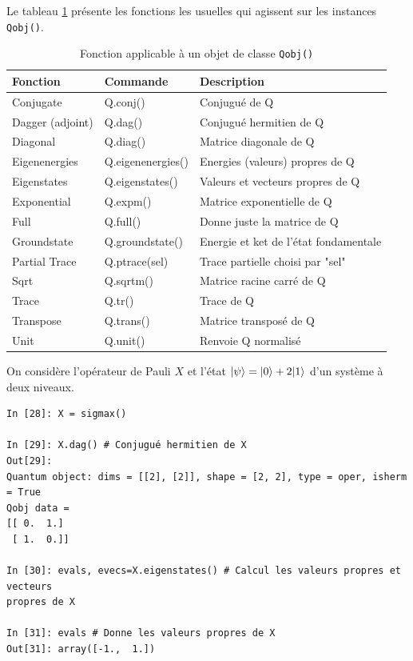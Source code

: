 \begin{itemize}
Le tableau \ref{tab:fonction} présente les fonctions les usuelles qui agissent 
sur les instances \texttt{Qobj()}.
\begin{table}[!h]
\centering
\begin{tabular}{|l|l|l|} \hline \hline
\textbf{Fonction}	& \textbf{Commande}	& \textbf{Description} \\ 
\hline \hline
Conjugate	& Q.conj()	& Conjugué de Q\\ \hline
Dagger (adjoint)	& Q.dag()	& Conjugué hermitien de Q\\ \hline
Diagonal	& Q.diag()	& Matrice diagonale de Q\\ \hline
Eigenenergies	& Q.eigenenergies()	&  Energies (valeurs) propres de Q\\ 
\hline
Eigenstates	& Q.eigenstates()	& Valeurs et vecteurs propres de Q\\ 
\hline
Exponential	& Q.expm()	& Matrice exponentielle de Q\\ \hline
Full	& Q.full()	& Donne juste la matrice de Q\\ \hline
Groundstate	& Q.groundstate()	& Energie et ket de l'état 
fondamentale\\ \hline
Partial Trace	& Q.ptrace(sel)	& Trace partielle choisi par "sel"\\ \hline
Sqrt	& Q.sqrtm()	& Matrice racine carré de Q\\ \hline
Trace	& Q.tr()	&  Trace de Q \\ \hline
Transpose	&  Q.trans()	& Matrice transposé de Q \\ \hline
Unit	& Q.unit()	& Renvoie Q normalisé \\ \hline
\end{tabular}
\caption{Fonction applicable à un objet de classe \texttt{Qobj()}}
\label{tab:fonction}
\end{table}

\begin{example}
On considère l'opérateur de Pauli $X$ et l'état $\vert\psi\rangle=\vert0\rangle+2\vert1\rangle$ 
d'un système à deux niveaux.\\
\begin{lstlisting}
In [28]: X = sigmax()

In [29]: X.dag() # Conjugué hermitien de X
Out[29]: 
Quantum object: dims = [[2], [2]], shape = [2, 2], type = oper, isherm = True
Qobj data =
[[ 0.  1.]
 [ 1.  0.]]

In [30]: evals, evecs=X.eigenstates() # Calcul les valeurs propres et vecteurs 
propres de X

In [31]: evals # Donne les valeurs propres de X
Out[31]: array([-1.,  1.])


\end{lstlisting}
\end{example}
\end{itemize}
